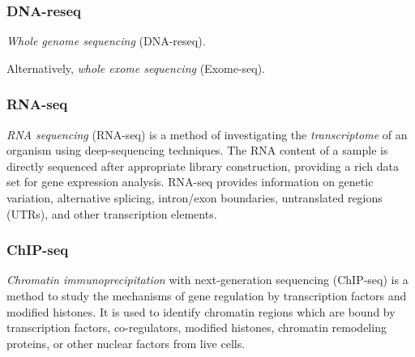 
\subsubsection{DNA-reseq}

\emph{Whole genome sequencing} (DNA-reseq).

Alternatively, \emph{whole exome sequencing} (Exome-seq).


\subsubsection{RNA-seq}
\emph{RNA sequencing} (RNA-seq) is a method of investigating the \emph{transcriptome} of an organism using deep-sequencing techniques.
The RNA content of a sample is directly sequenced after appropriate library construction, providing a rich data set for gene expression analysis.
RNA-seq provides information on genetic variation, alternative splicing, intron/exon boundaries, untranslated regions (UTRs), and other transcription elements.

\subsubsection{ChIP-seq}
\emph{Chromatin immunoprecipitation} with next-generation sequencing (ChIP-seq) is a method to study the mechanisms of gene regulation by transcription factors and modified histones.
It is used to identify chromatin regions which are bound by transcription factors, co-regulators, modified histones, chromatin remodeling proteins, or other nuclear factors from live cells.


